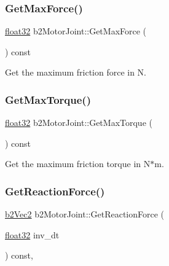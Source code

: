 \subsubsection{\texorpdfstring{GetMaxForce()}{GetMaxForce()}}
{\footnotesize\ttfamily \mbox{\hyperlink{b2_settings_8h_aacdc525d6f7bddb3ae95d5c311bd06a1}{float32}} b2\+Motor\+Joint\+::\+Get\+Max\+Force (\begin{DoxyParamCaption}{ }\end{DoxyParamCaption}) const}



Get the maximum friction force in N. 

\mbox{\label{classb2_motor_joint_a40d4e4e852a6a722708f0c47b5c9fd69}} 
\subsubsection{\texorpdfstring{GetMaxTorque()}{GetMaxTorque()}}
{\footnotesize\ttfamily \mbox{\hyperlink{b2_settings_8h_aacdc525d6f7bddb3ae95d5c311bd06a1}{float32}} b2\+Motor\+Joint\+::\+Get\+Max\+Torque (\begin{DoxyParamCaption}{ }\end{DoxyParamCaption}) const}



Get the maximum friction torque in N$\ast$m. 

\mbox{\label{classb2_motor_joint_a85a3ac568e797d0620dcf4f7532ed949}} 
\subsubsection{\texorpdfstring{GetReactionForce()}{GetReactionForce()}}
{\footnotesize\ttfamily \mbox{\hyperlink{structb2_vec2}{b2\+Vec2}} b2\+Motor\+Joint\+::\+Get\+Reaction\+Force (\begin{DoxyParamCaption}\item[{\mbox{\hyperlink{b2_settings_8h_aacdc525d6f7bddb3ae95d5c311bd06a1}{float32}}}]{inv\+\_\+dt }\end{DoxyParamCaption}) const\hspace{0.3cm}{\ttfamily [override]}, {\ttfamily [virtual]}}



